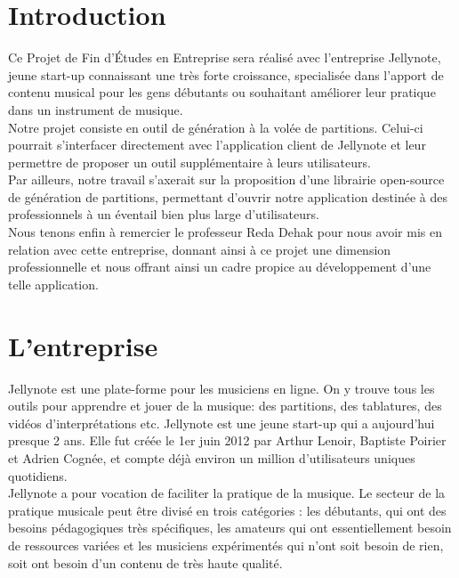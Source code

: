 \documentclass[12pt]{article}
\begin{document}



\newpage
\tableofcontents

\newpage
\clearpage

\section{Introduction}

Ce Projet de Fin d'Études en Entreprise sera réalisé avec l'entreprise Jellynote, jeune start-up connaissant une très forte croissance, specialisée dans l'apport de contenu musical pour les gens débutants ou souhaitant améliorer leur pratique dans un instrument de musique.\\

Notre projet consiste en outil de génération à la volée de partitions. Celui-ci pourrait s'interfacer directement avec l'application client de Jellynote et leur permettre de proposer un outil supplémentaire à leurs utilisateurs.\\

Par ailleurs, notre travail s'axerait sur la proposition d'une librairie open-source de génération de partitions, permettant d'ouvrir notre application destinée à des professionnels à un éventail bien plus large d'utilisateurs.\\

Nous tenons enfin à remercier le professeur Reda Dehak pour nous avoir mis en relation avec cette entreprise, donnant ainsi à ce projet une dimension professionnelle et nous offrant ainsi un cadre propice au développement d'une telle application.


\newpage
\section{L'entreprise}
Jellynote est une plate-forme pour les musiciens en ligne. On y trouve tous les outils pour apprendre et jouer de la musique: des partitions, des tablatures, des vidéos d’interprétations etc. Jellynote est une jeune start-up qui a aujourd’hui presque 2 ans. Elle fut créée le 1er juin 2012 par Arthur Lenoir, Baptiste Poirier et Adrien Cognée, et compte déjà environ un million d'utilisateurs uniques quotidiens.\\

Jellynote a pour vocation de faciliter la pratique de la musique. Le secteur de la pratique musicale peut être divisé en trois catégories : les débutants, qui ont des besoins pédagogiques très spécifiques, les amateurs qui ont essentiellement besoin de ressources variées et les musiciens expérimentés qui n’ont soit besoin de rien, soit ont besoin d’un contenu de très haute qualité.\\
\end{document}
